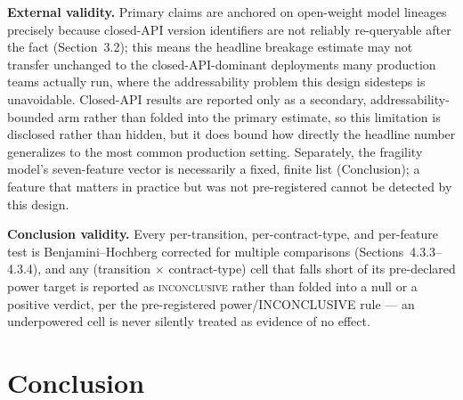 \documentclass[11pt]{article}
\begin{document}
\textbf{External validity.} Primary claims are anchored on open-weight model lineages precisely because closed-API version identifiers are not reliably re-queryable after the fact (Section~3.2); this means the headline breakage estimate may not transfer unchanged to the closed-API-dominant deployments many production teams actually run, where the addressability problem this design sidesteps is unavoidable. Closed-API results are reported only as a secondary, addressability-bounded arm rather than folded into the primary estimate, so this limitation is disclosed rather than hidden, but it does bound how directly the headline number generalizes to the most common production setting. Separately, the fragility model's seven-feature vector is necessarily a fixed, finite list (Conclusion); a feature that matters in practice but was not pre-registered cannot be detected by this design.

\textbf{Conclusion validity.} Every per-transition, per-contract-type, and per-feature test is Benjamini--Hochberg corrected for multiple comparisons (Sections~4.3.3--4.3.4), and any (transition $\times$ contract-type) cell that falls short of its pre-declared power target is reported as \textsc{inconclusive} rather than folded into a null or a positive verdict, per the pre-registered power/INCONCLUSIVE rule --- an underpowered cell is never silently treated as evidence of no effect.

\section{Conclusion}
\end{document}
